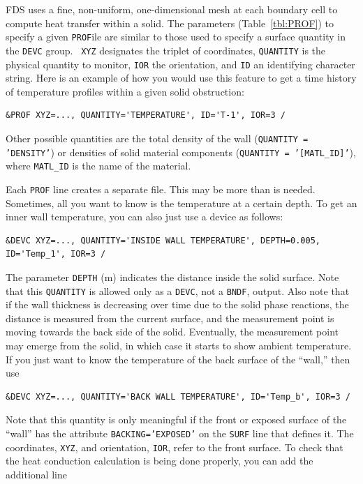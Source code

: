 \documentclass[11pt]{book}
\newcommand{\ct}{\tt\small}
\begin{document}
FDS uses a fine, non-uniform, one-dimensional mesh at each boundary
cell to compute heat transfer within a solid. The parameters
(Table~\ref{tbl:PROF}) to specify a given {\ct PROF}ile are similar to
those used to specify a surface quantity in the {\ct DEVC} group. {\ct
XYZ} designates the triplet of coordinates, {\ct QUANTITY} is the
physical quantity to monitor, {\ct IOR} the orientation,
and {\ct ID} an identifying character string. Here is an example of
how you would use this feature to get a time history of temperature
profiles within a given solid obstruction:

\footnotesize
\begin{verbatim}
&PROF XYZ=..., QUANTITY='TEMPERATURE', ID='T-1', IOR=3 /
\end{verbatim} \normalsize

\noindent
Other possible quantities are the total density of the wall ({\ct QUANTITY = 'DENSITY'}) or densities of
solid material components ({\ct QUANTITY = '[MATL\_ID]'}), where {\ct MATL\_ID} is the name of the
material.

Each {\ct PROF} line creates a separate file. This may be more than is
needed. Sometimes, all you want to know is the temperature at a
certain depth. To get an inner wall temperature, you can also just use
a device as follows:

\footnotesize
\begin{verbatim}
&DEVC XYZ=..., QUANTITY='INSIDE WALL TEMPERATURE', DEPTH=0.005, ID='Temp_1', IOR=3 /
\end{verbatim} \normalsize

\noindent
The parameter {\ct DEPTH} (m) indicates the distance inside the solid surface.
Note that this {\ct QUANTITY} is allowed only as a {\ct DEVC}, not a
{\ct BNDF}, output. Also note that if the wall thickness is decreasing
over time due to the solid phase reactions, the distance is
measured from the current surface, and the measurement point is
moving towards the back side of the solid. Eventually, the
measurement point may emerge from the solid, in which case it starts to
show ambient temperature. If you just want to know the temperature of the back surface
of the ``wall,'' then use

\footnotesize
\begin{verbatim}
&DEVC XYZ=..., QUANTITY='BACK WALL TEMPERATURE', ID='Temp_b', IOR=3 /
\end{verbatim} \normalsize

\noindent
Note that this quantity is only meaningful if the front or exposed surface of the ``wall'' has
the attribute {\ct BACKING='EXPOSED'} on the {\ct SURF} line that defines it. The coordinates, {\ct XYZ}, and orientation, {\ct IOR}, refer to
the front surface. To check that the heat conduction calculation is being done properly, you can add the additional line
\end{document}
